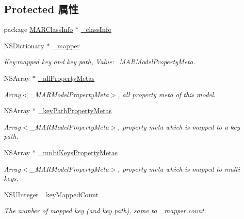 \subsection*{Protected 属性}
\begin{DoxyCompactItemize}
\item 
package \hyperlink{interface_m_a_r_class_info}{M\+A\+R\+Class\+Info} $\ast$ \hyperlink{interface___m_a_r_model_meta_a204d0925156617e17a1fe593057ffdf0}{\+\_\+class\+Info}
\item 
N\+S\+Dictionary $\ast$ \hyperlink{interface___m_a_r_model_meta_af00312d68b9271700afe0c978de3fca9}{\+\_\+mapper}
\begin{DoxyCompactList}\small\item\em Key\+:mapped key and key path, Value\+:\hyperlink{interface___m_a_r_model_property_meta}{\+\_\+\+M\+A\+R\+Model\+Property\+Meta}. \end{DoxyCompactList}\item 
N\+S\+Array $\ast$ \hyperlink{interface___m_a_r_model_meta_a0175dc46a22e059fa22a7851673c9555}{\+\_\+all\+Property\+Metas}
\begin{DoxyCompactList}\small\item\em Array$<$\+\_\+\+M\+A\+R\+Model\+Property\+Meta$>$, all property meta of this model. \end{DoxyCompactList}\item 
N\+S\+Array $\ast$ \hyperlink{interface___m_a_r_model_meta_a0916478f905728482fe617131c4a3196}{\+\_\+key\+Path\+Property\+Metas}
\begin{DoxyCompactList}\small\item\em Array$<$\+\_\+\+M\+A\+R\+Model\+Property\+Meta$>$, property meta which is mapped to a key path. \end{DoxyCompactList}\item 
N\+S\+Array $\ast$ \hyperlink{interface___m_a_r_model_meta_a599aa3e73277c70a71d195288afa184a}{\+\_\+multi\+Keys\+Property\+Metas}
\begin{DoxyCompactList}\small\item\em Array$<$\+\_\+\+M\+A\+R\+Model\+Property\+Meta$>$, property meta which is mapped to multi keys. \end{DoxyCompactList}\item 
N\+S\+U\+Integer \hyperlink{interface___m_a_r_model_meta_a9eaedf54204c713bb9a4ea724fc63224}{\+\_\+key\+Mapped\+Count}
\begin{DoxyCompactList}\small\item\em The number of mapped key (and key path), same to \+\_\+mapper.\+count. \end{DoxyCompactList}\item 

\end{DoxyCompactItemize}
